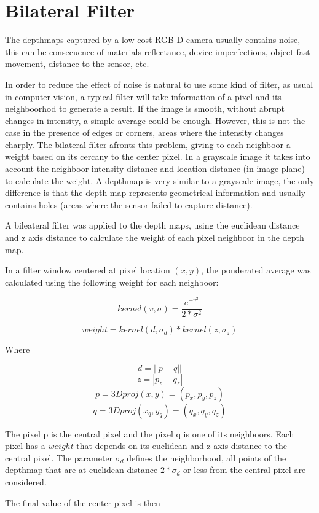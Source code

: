 \section{Bilateral Filter}


The depthmaps captured by a low cost RGB-D camera usually contains noise, this can be 
consecuence of materials reflectance, device imperfections, object fast movement, distance to the 
sensor, etc. 

In order to reduce the effect of noise is natural to use some kind of filter, as usual in computer 
vision, a typical filter will take information of a pixel and its neighboorhod to generate a result. 
If the image is smooth, without abrupt changes in intensity, a simple average could be enough. However, this 
is not the case in the presence of edges or corners, areas where the intensity changes charply. 
The bilateral filter afronts this problem, giving to each neighboor a weight based on its cercany  
to the center pixel. In a grayscale image it takes into account 
the neighboor intensity distance and location distance (in image plane) to calculate the weight.  A depthmap is very similar to a grayscale 
image, the only difference is that the depth map represents geometrical information and usually contains holes 
(areas where the sensor failed to capture distance). 

A bileateral filter was applied to the depth maps, using the euclidean distance and z axis distance to calculate 
the weight of each pixel neighboor in the depth map.

In a filter window centered at pixel location $(x,y)$, the ponderated average was calculated using the following weight for each neighboor:

$$ kernel(v,\sigma) = \frac{e^{-v^2}}{2*\sigma^2} $$

$$ weight = kernel(d,\sigma_d)*kernel(z,\sigma_z) $$

Where 

$$ d = ||p - q|| $$
$$ z = |p_z - q_z| $$
$$ p = 3Dproj(x,y) = (p_x,p_y,p_z) $$ 
$$ q = 3Dproj(x_q,y_q) = (q_x,q_y,q_z) $$

The pixel p is the central pixel and the pixel q is one of its neighboors. Each pixel has a $weight$ that depends on its euclidean and z axis distance to the central pixel. The parameter $\sigma_d$ defines 
the neighborhood, all points of the depthmap that are at euclidean distance $2*\sigma_d$ or less from the central pixel are considered.

The final value of the center pixel is then

